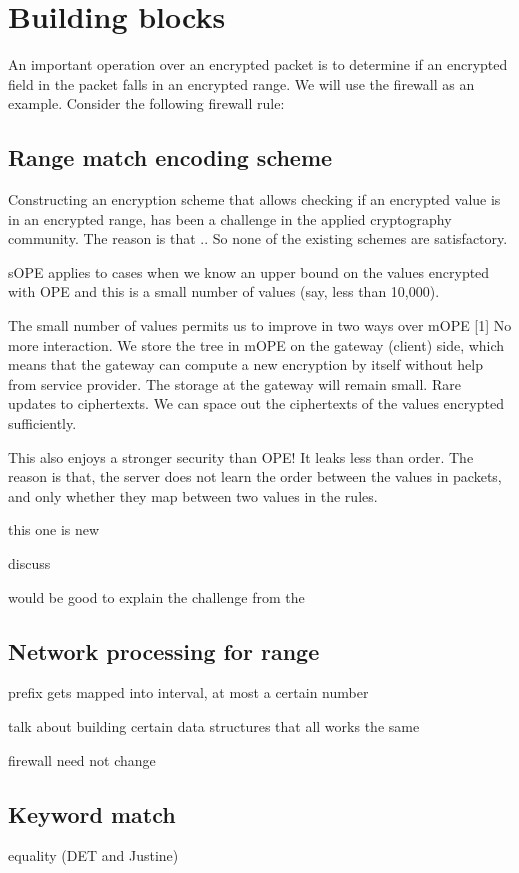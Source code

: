 \section{Building blocks}\label{sec:blocks}


An important operation over an encrypted packet is to determine if an encrypted field in the packet falls in an encrypted range.
We will use the firewall as an example. 
Consider the following firewall rule:




\subsection{Range match encoding scheme}


Constructing an encryption scheme that allows checking if an encrypted value is in an encrypted range, has been a challenge in the applied cryptography community. The reason is that ..
So none of the existing schemes are satisfactory.



sOPE applies to cases when we know an upper bound on the values encrypted with OPE and this is a small number of values (say, less than 10,000).

The small number of values permits us to improve in two ways over mOPE [1]
No more interaction. We store the tree in mOPE on the gateway (client) side, which means that the gateway can compute a new encryption by itself without help from service provider. The storage at the gateway will remain small.
Rare updates to ciphertexts. We can space out the ciphertexts of the values encrypted sufficiently. 

This also enjoys a stronger security than OPE! It leaks less than order.
The reason is that, the server does not learn the order between the values in packets, and only whether they map between two values in the rules. 





this one is new

discuss 

would be good to explain the challenge from the 


\subsection{Network processing for range}

prefix gets mapped into interval, at most a certain number

talk about building certain data structures that all works the same

firewall need not change 

\subsection{Keyword match}


equality (DET and Justine)